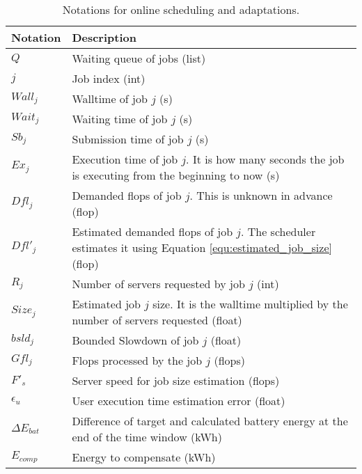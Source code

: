 \begin{table*}[!htb]
\centering
\caption{Notations for online scheduling and adaptations.}
\label{tab:notation_job}
\begin{tabular}{l|p{12cm}}
    \hline
    Notation & Description \\\hline\hline
    $Q$ & Waiting queue of jobs (list)\\
    $j$ & Job index (int)\\
    $Wall_j$ & Walltime of job $j$ (s)\\
    $Wait_j$ & Waiting time of job $j$ (s)\\
    $Sb_j$ & Submission time of job $j$ (s)\\
    $Ex_j$ & Execution time of job $j$. It is how many seconds the job is executing from the beginning to now (s)\\
    $Dfl_j$ & Demanded flops of job $j$. This is unknown in advance (flop)\\
    $Dfl'_j$ & Estimated demanded flops of job $j$. The scheduler estimates it using Equation \ref{equ:estimated_job_size} (flop)\\
    $R_j$ & Number of servers requested by job $j$ (int) \\
    $Size_j$ & Estimated job $j$ size. It is the walltime multiplied by the number of servers requested (float)\\
    $bsld_j$ & Bounded Slowdown of job $j$ (float)\\
    $Gfl_j$ & Flops processed by the job $j$ (flops)\\
    $F'_{s}$ & Server speed for job size estimation (flops)\\
    $\epsilon_{u}$ & User execution time estimation error (float)\\
    $\Delta E_{bat}$ & Difference of target and calculated battery energy at the end of the time window (kWh)\\
    $E_{comp}$ & Energy to compensate (kWh)\\
    \hline
\end{tabular}
\end{table*}